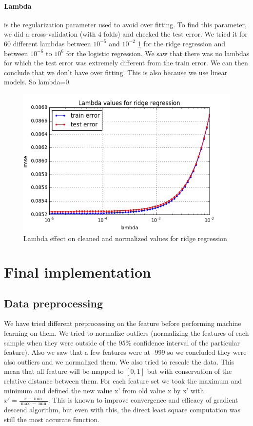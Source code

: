 \documentclass[10pt,conference,compsocconf]{IEEEtran}
\begin{document}
\paragraph{Lambda} is the regularization parameter used to avoid over fitting. To find this parameter, we did a cross-validation (with 4 folds) and checked the test error. We tried it for 60 different lambdas between $10^{-5}$ and $10^{-2}$  \ref{fig1} for the ridge regression and between $10^{-6}$ to $10^6$ for the logistic regression. We saw that there was no lambdas for which the test error was extremely different from the train error. We can then conclude that we don’t have over fitting. This is also because we use linear models. So lambda=0.
\begin{figure}[tbp]
  \centering
  \includegraphics[width=\columnwidth]{Lambda values for ridge regression}
  \caption{Lambda effect on cleaned and normalized values for ridge regression}
  \vspace{-3mm}
  \label{fig1}
\end{figure}
\section{Final implementation}
\subsection{Data preprocessing} We have tried different preprocessing on the feature before performing machine learning on them. We tried to normalize outliers (normalizing the features of each sample when they were outside of the 95\% confidence interval of the particular feature). Also we saw that a few features were at -999 so we concluded they were also outliers and we normalized them.
We also tried to rescale the data. This mean that all feature will be  mapped to \( [0,1] \) but with conservation of the relative distance between them. For each feature set we took the maximum and minimum and defined the new value x' from old value x by x' with $x' = \frac{x-\min}{\max - \min }$. This is known to improve convergence and efficacy of gradient descend algorithm, but even with this, the direct least square computation was still the most accurate function.
\end{document}
